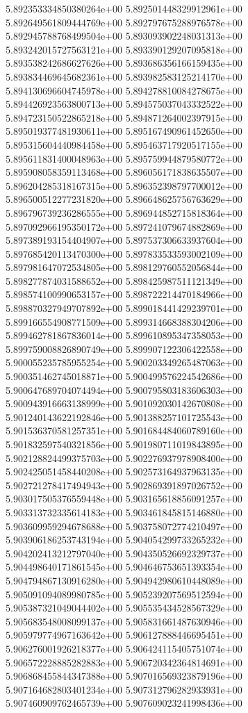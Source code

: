 5.892353334850380264e+00
5.892501448329912961e+00
5.892649561809444769e+00
5.892797675288976578e+00
5.892945788768499504e+00
5.893093902248031313e+00
5.893242015727563121e+00
5.893390129207095818e+00
5.893538242686627626e+00
5.893686356166159435e+00
5.893834469645682361e+00
5.893982583125214170e+00
5.894130696604745978e+00
5.894278810084278675e+00
5.894426923563800713e+00
5.894575037043332522e+00
5.894723150522865218e+00
5.894871264002397915e+00
5.895019377481930611e+00
5.895167490961452650e+00
5.895315604440984458e+00
5.895463717920517155e+00
5.895611831400048963e+00
5.895759944879580772e+00
5.895908058359113468e+00
5.896056171838635507e+00
5.896204285318167315e+00
5.896352398797700012e+00
5.896500512277231820e+00
5.896648625756763629e+00
5.896796739236286555e+00
5.896944852715818364e+00
5.897092966195350172e+00
5.897241079674882869e+00
5.897389193154404907e+00
5.897537306633937604e+00
5.897685420113470300e+00
5.897833533593002109e+00
5.897981647072534805e+00
5.898129760552056844e+00
5.898277874031588652e+00
5.898425987511121349e+00
5.898574100990653157e+00
5.898722214470184966e+00
5.898870327949707892e+00
5.899018441429239701e+00
5.899166554908771509e+00
5.899314668388304206e+00
5.899462781867836014e+00
5.899610895347358053e+00
5.899759008826890749e+00
5.899907122306422558e+00
5.900055235785955254e+00
5.900203349265487063e+00
5.900351462745018871e+00
5.900499576224542686e+00
5.900647689704074494e+00
5.900795803183606303e+00
5.900943916663138999e+00
5.901092030142670808e+00
5.901240143622192846e+00
5.901388257101725543e+00
5.901536370581257351e+00
5.901684484060789160e+00
5.901832597540321856e+00
5.901980711019843895e+00
5.902128824499375703e+00
5.902276937978908400e+00
5.902425051458440208e+00
5.902573164937963135e+00
5.902721278417494943e+00
5.902869391897026752e+00
5.903017505376559448e+00
5.903165618856091257e+00
5.903313732335614183e+00
5.903461845815146880e+00
5.903609959294678688e+00
5.903758072774210497e+00
5.903906186253743194e+00
5.904054299733265232e+00
5.904202413212797040e+00
5.904350526692329737e+00
5.904498640171861545e+00
5.904646753651393354e+00
5.904794867130916280e+00
5.904942980610448089e+00
5.905091094089980785e+00
5.905239207569512594e+00
5.905387321049044402e+00
5.905535434528567329e+00
5.905683548008099137e+00
5.905831661487630946e+00
5.905979774967163642e+00
5.906127888446695451e+00
5.906276001926218377e+00
5.906424115405751074e+00
5.906572228885282883e+00
5.906720342364814691e+00
5.906868455844347388e+00
5.907016569323879196e+00
5.907164682803401234e+00
5.907312796282933931e+00
5.907460909762465739e+00
5.907609023241998436e+00
